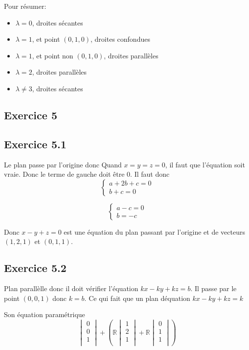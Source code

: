 \documentclass[]{book}
\theoremstyle{definition}
\newcommand{\bb}[1]{\mathbb{#1}}
\newcommand{\R}{\bb{R}}
\begin{document}
Pour r\'esumer:
\begin{itemize}
    \item $\lambda = 0$, droites s\'ecantes
    \item $\lambda = 1$, et point $(0,1,0)$, droites confondues
    \item $\lambda = 1$, et point non $(0,1,0)$, droites parall\`eles
    \item $\lambda = 2$, droites parall\`eles
    \item $\lambda \neq 3$, droites s\'ecantes
\end{itemize}

\subsection*{Exercice 5}
\subsection*{Exercice 5.1}
Le plan passe par l'origine donc Quand $x=y=z=0$, il faut que l'\'equation soit vraie. Donc le terme de gauche doit \^etre 0. Il faut donc
$$
\left\{ 
    \begin{array}{l}
        a + 2b + c = 0\\
        b + c = 0
    \end{array}
\right.
$$

$$
\left\{ 
    \begin{array}{l}
        a - c = 0\\
        b = - c
    \end{array}
\right.
$$

Donc $x - y + z = 0$ est une \'equation du plan passant par l'origine et de vecteurs $(1,2,1)$ et $(0,1,1)$.

\subsection*{Exercice 5.2}
Plan parall\`elle donc il doit v\'erifier l'\'equation $kx -ky + kz = b$. Il passe par le point $(0,0,1)$ donc
$k = b$. Ce qui fait que un plan d\'equation $kx - ky + kz = k$

Son \'equation param\'etrique
$$
\begin{vmatrix}
    0 \\
    0 \\
    1 \\
\end{vmatrix}
+(\R
    \begin{vmatrix}
        1 \\
        2 \\
        1 \\
    \end{vmatrix}
+    
\R
    \begin{vmatrix}
        0 \\
        1 \\
        1 \\
    \end{vmatrix}
)
$$
\end{document}
